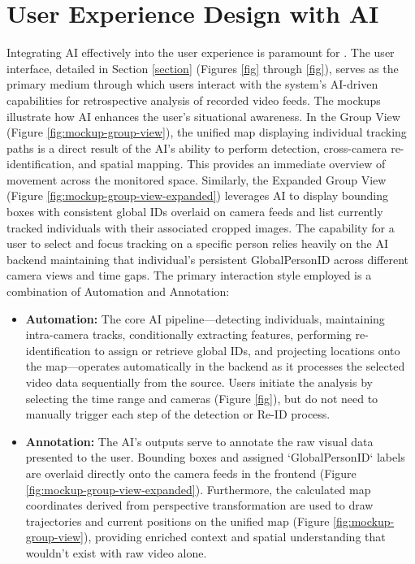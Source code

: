 \section{User Experience Design with AI}
\label{section:ux_design} %
Integrating AI effectively into the user experience is paramount for \usevar{\srsTitle}. The user interface, detailed in Section \ref{section} (Figures \ref{fig} through \ref{fig}), serves as the primary medium through which users interact with the system's AI-driven capabilities for retrospective analysis of recorded video feeds.
The mockups illustrate how AI enhances the user's situational awareness. In the Group View (Figure \ref{fig:mockup-group-view}), the unified map displaying individual tracking paths is a direct result of the AI's ability to perform detection, cross-camera re-identification, and spatial mapping. This provides an immediate overview of movement across the monitored space. Similarly, the Expanded Group View (Figure \ref{fig:mockup-group-view-expanded}) leverages AI to display bounding boxes with consistent global IDs overlaid on camera feeds and list currently tracked individuals with their associated cropped images. The capability for a user to select and focus tracking on a specific person relies heavily on the AI backend maintaining that individual's persistent GlobalPersonID across different camera views and time gaps.
The primary interaction style employed is a combination of Automation and Annotation:
\begin{itemize}
    \item \textbf{Automation:} The core AI pipeline—detecting individuals, maintaining intra-camera tracks, conditionally extracting features, performing re-identification to assign or retrieve global IDs, and projecting locations onto the map—operates automatically in the backend as it processes the selected video data sequentially from the source. Users initiate the analysis by selecting the time range and cameras (Figure \ref{fig}), but do not need to manually trigger each step of the detection or Re-ID process.
    \item \textbf{Annotation:} The AI's outputs serve to annotate the raw visual data presented to the user. Bounding boxes and assigned `GlobalPersonID` labels are overlaid directly onto the camera feeds in the frontend (Figure \ref{fig:mockup-group-view-expanded}). Furthermore, the calculated map coordinates derived from perspective transformation are used to draw trajectories and current positions on the unified map (Figure \ref{fig:mockup-group-view}), providing enriched context and spatial understanding that wouldn't exist with raw video alone.
\end{itemize}
